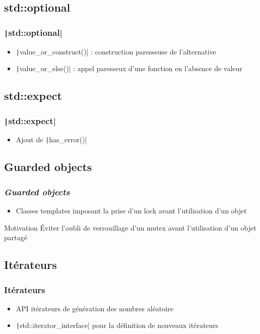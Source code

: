 \documentclass[C++.tex]{subfiles}
\begin{document}
\subsection*{std::optional}
\begin{frame}[fragile]
	\frametitle{\texttt|std::optional|}
	\begin{itemize}
		\item \texttt|value_or_construct()| : construction paresseuse de l'alternative
		\item \texttt|value_or_else()| : appel paresseux d'une fonction en l'absence de valeur
	\end{itemize}

\end{frame}

\subsection*{std::expect}
\begin{frame}[fragile]
	\frametitle{\texttt|std::expect|}
	\begin{itemize}
		\item Ajout de \texttt|has_error()|
	\end{itemize}

\end{frame}

\subsection*{Guarded objects}
\begin{frame}[fragile]
	\frametitle{\textit{Guarded objects}}
	\begin{itemize}
		\item Classes templates imposant la prise d'un lock avant l'utilisation d'un objet
	\end{itemize}

	\begin{block}{Motivation}
		Éviter l'oubli de verrouillage d'un mutex avant l'utilisation d'un objet partagé
	\end{block}

\end{frame}

\subsection*{Itérateurs}
\begin{frame}[fragile]
	\frametitle{Itérateurs}
	\begin{itemize}
		\item API itérateurs de génération des nombres aléatoire
		\item \texttt|std::iterator_interface| pour la définition de nouveaux itérateurs
	\end{itemize}

\end{frame}
\end{document}
